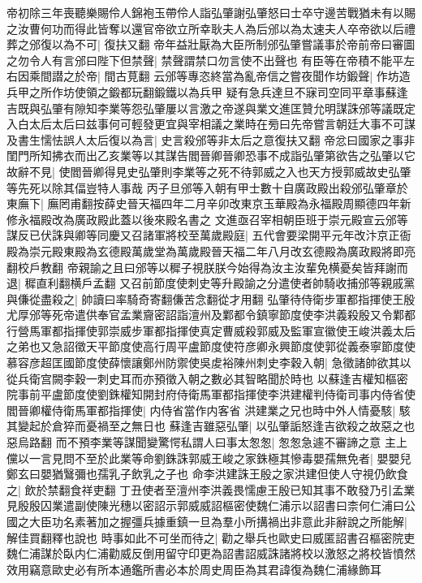 帝初除三年喪聽樂賜伶人錦袍玉帶伶人詣弘肇謝弘肇怒曰士卒守邊苦戰猶未有以賜之汝曹何功而得此皆奪以還官帝欲立所幸耿夫人為后邠以為太速夫人卒帝欲以后禮葬之邠復以為不可|{
	復扶又翻}
帝年益壯厭為大臣所制邠弘肇嘗議事於帝前帝曰審圖之勿令人有言邠曰陛下但禁聲|{
	禁聲謂禁口勿言使不出聲也}
有臣等在帝積不能平左右因乘間譛之於帝|{
	間古莧翻}
云邠等專恣終當為亂帝信之嘗夜聞作坊鍛聲|{
	作坊造兵甲之所作坊使領之鍛都玩翻鍛鐵以為兵甲}
疑有急兵達旦不寐司空同平章事蘇逢吉既與弘肇有隙知李業等怨弘肇屢以言激之帝遂與業文進匡贊允明謀誅邠等議既定入白太后太后曰兹事何可輕發更宜與宰相議之業時在㫄曰先帝嘗言朝廷大事不可謀及書生懦怯誤人太后復以為言|{
	史言殺邠等非太后之意復扶又翻}
帝忿曰國家之事非閨門所知拂衣而出乙亥業等以其謀告閻晉卿晉卿恐事不成詣弘肇第欲告之弘肇以它故辭不見|{
	使閻晉卿得見史弘肇則李業等之死不待郭威之入也天方授郭威故史弘肇等先死以除其偪豈特人事哉}
丙子旦邠等入朝有甲士數十自廣政殿出殺邠弘肇章於東廡下|{
	廡罔甫翻按薛史晉天福四年二月辛卯改東京玉華殿為永福殿周顯德四年新修永福殿改為廣政殿此蓋以後來殿名書之}
文進亟召宰相朝臣班于崇元殿宣云邠等謀反已伏誅與卿等同慶又召諸軍將校至萬歲殿庭|{
	五代會要梁開平元年改汴京正衙殿為崇元殿東殿為玄德殿萬歲堂為萬歲殿晉天福二年八月改玄德殿為廣政殿將即亮翻校戶教翻}
帝親諭之且曰邠等以穉子視朕朕今始得為汝主汝輩免横憂矣皆拜謝而退|{
	穉直利翻横戶孟翻}
又召前節度使刺史等升殿諭之分遣使者帥騎收捕邠等親戚黨與傔從盡殺之|{
	帥讀曰率騎奇寄翻傔苦念翻從才用翻}
弘肇待侍衛步軍都指揮使王殷尤厚邠等死帝遣供奉官孟業齎密詔詣澶州及鄴都令鎮寧節度使李洪義殺殷又令鄴都行營馬軍都指揮使郭崇威步軍都指揮使真定曹威殺郭威及監軍宣徽使王峻洪義太后之弟也又急詔徵天平節度使高行周平盧節度使符彦卿永興節度使郭從義泰寧節度使慕容彦超匡國節度使薛懷讓鄭州防禦使吳䖍裕陳州刺史李穀入朝|{
	急徵諸帥欲其以從兵衛宫闕李穀一刺史耳而亦預徵入朝之數必其智略聞於時也}
以蘇逢吉權知樞密院事前平盧節度使劉銖權知開封府侍衛馬軍都指揮使李洪建權判侍衛司事内侍省使閻晉卿權侍衛馬軍都指揮使|{
	内侍省當作内客省}
洪建業之兄也時中外人情憂駭|{
	駭其變起於倉猝而憂禍至之無日也}
蘇逢吉雖惡弘肇|{
	以弘肇詬怒逢吉欲殺之故惡之也惡烏路翻}
而不預李業等謀聞變驚愕私謂人曰事太怱怱|{
	怱怱急遽不審諦之意}
主上儻以一言見問不至於此業等命劉銖誅郭威王峻之家銖極其慘毒嬰孺無免者|{
	嬰嬰兒鄭玄曰嬰猶鷖彌也孺乳子飲乳之子也}
命李洪建誅王殷之家洪建但使人守視仍飲食之|{
	飲於禁翻食祥吏翻}
丁丑使者至澶州李洪義畏懦慮王殷已知其事不敢發乃引孟業見殷殷囚業遣副使陳光穗以密詔示郭威威詔樞密使魏仁浦示以詔書曰柰何仁浦曰公國之大臣功名素著加之握彊兵據重鎮一旦為羣小所搆禍出非意此非辭說之所能解|{
	解佳買翻釋也說也}
時事如此不可坐而待之|{
	勸之舉兵也歐史曰威匿詔書召樞密院吏魏仁浦謀於臥内仁浦勸威反倒用留守印更為詔書詔威誅諸將校以激怒之將校皆憤然效用竊意歐史必有所本通鑑所書必本於周史周臣為其君諱復為魏仁浦緣飾耳}
